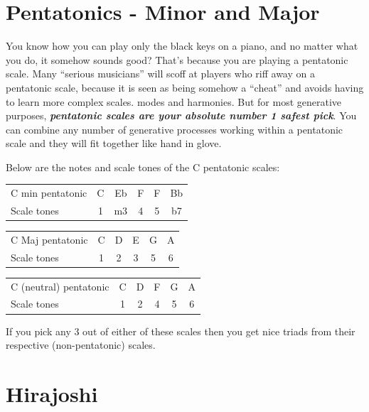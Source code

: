 \documentclass[
  12pt,
  letterpaper,
  oneside,
  open=any]{scrbook}
\begin{document}
\section{Pentatonics - Minor and
Major}\label{pentatonics---minor-and-major}

You know how you can play only the black keys on a piano, and no matter
what you do, it somehow sounds good? That's because you are playing a
pentatonic scale. Many ``serious musicians'' will scoff at players who
riff away on a pentatonic scale, because it is seen as being somehow a
``cheat'' and avoids having to learn more complex scales. modes and
harmonies. But for most generative purposes, \textbf{\emph{pentatonic
scales are your absolute number 1 safest pick}}. You can combine any
number of generative processes working within a pentatonic scale and
they will fit together like hand in glove.

Below are the notes and scale tones of the C pentatonic scales:

\begin{longtable}[]{@{}lccccc@{}}
\toprule\noalign{}
\endhead
\bottomrule\noalign{}
\endlastfoot
C min pentatonic & C & Eb & F & F & Bb \\
Scale tones & 1 & m3 & 4 & 5 & b7 \\
\end{longtable}

\begin{longtable}[]{@{}lccccc@{}}
\toprule\noalign{}
\endhead
\bottomrule\noalign{}
\endlastfoot
C Maj pentatonic & C & D & E & G & A \\
Scale tones & 1 & 2 & 3 & 5 & 6 \\
\end{longtable}

\begin{longtable}[]{@{}lccccc@{}}
\toprule\noalign{}
\endhead
\bottomrule\noalign{}
\endlastfoot
C (neutral) pentatonic & C & D & F & G & A \\
Scale tones & 1 & 2 & 4 & 5 & 6 \\
\end{longtable}

If you pick any 3 out of either of these scales then you get nice triads
from their respective (non-pentatonic) scales.

\section{Hirajoshi}\label{hirajoshi}
\end{document}
